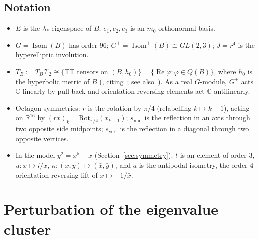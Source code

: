 \documentclass[11pt]{amsart}
\theoremstyle{definition}
\theoremstyle{remark}
\newcommand{\R}{\mathbb{R}}
\newcommand{\C}{\mathbb{C}}
\newcommand{\Teich}{\mathcal{T}_2}
\newcommand{\Isom}{\operatorname{Isom}}
\newcommand{\ls}{\lambda_*}
\newcommand{\smid}{s_{\mathrm{mid}}}
\newcommand{\svert}{s_{\mathrm{vert}}}
\begin{document}
\subsection{Notation}\label{subsec:notation}
\begin{itemize}
\item $E$ is the $\ls$-eigenspace of $B$; $e_1,e_2,e_3$ is an $m_0$-orthonormal basis.
\item $G=\Isom(B)$ has order $96$; $G^+=\Isom^+(B)\cong GL(2,3)$; $J=r^4$ is the hyperelliptic
involution.
\item $T_B:=T_B\Teich\cong\{\text{TT tensors on }(B,h_0)\}=\{\operatorname{Re}\varphi:\varphi\in
Q(B)\}$, where $h_0$ is the hyperbolic metric of $B$
(\cite[\S1]{Maz}, citing~\cite{Tro92}; see also~\cite[\S2]{DW}). As a real $G$-module,
$G^+$ acts $\C$-linearly by pull-back and orientation-reversing elements act $\C$-antilinearly.
\item Octagon symmetries: $r$ is the rotation by $\pi/4$ (relabelling $k\mapsto k+1$), acting
on $\R^{16}$ by $(rx)_k=\mathrm{Rot}_{\pi/4}(x_{k-1})$; $\smid$ is the reflection in an axis
through two opposite side midpoints; $\svert$ is the reflection in a diagonal through two
opposite vertices.
\item In the model $y^2=x^5-x$ (Section~\ref{sec:symmetry}): $t$ is an element of order $3$,
$u\colon x\mapsto i/x$, $\kappa\colon(x,y)\mapsto(\bar x,\bar y)$, and $a$ is the antipodal
isometry, the order-$4$ orientation-reversing lift of $x\mapsto-1/\bar x$.
\end{itemize}

\section{Perturbation of the eigenvalue cluster}\label{sec:perturbation}
\end{document}
